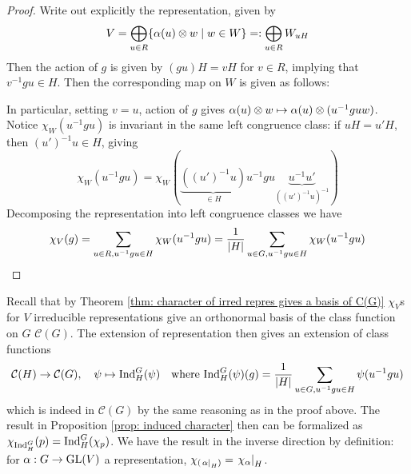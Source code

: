 \documentclass{article}
\begin{document}
\begin{proof}
    Write out explicitly the representation, given by
    \[
        V = \bigoplus_{u \in R} \{ \alpha(u) \otimes w \mid w \in W \} =: \bigoplus_{u \in R} W_{uH}
    \]
    Then the action of $g$ is given by $(gu) H = v H$ for $v \in R$, implying that $v^{-1} g u \in H$. Then the corresponding map on $W$ is given as follows:

    \begin{minipage}{\linewidth}
        \centering
    \end{minipage}
    In particular, setting $v = u$, action of $g$ gives $\alpha(u) \otimes w \mapsto \alpha(u) \otimes (u^{-1} gu w)$. Notice $\chi_W (u^{-1} g u)$ is invariant in the same left congruence class: if $uH = u'H$, then $(u')^{-1} u \in H$, giving 
    \[
        \chi_W (u^{-1} g u) = \chi_W (\underbrace{((u')^{-1} u)}_{\in H} u^{-1} g u \underbrace{u^{-1} u'}_{((u')^{-1} u)^{-1}} )
    \]
    Decomposing the representation into left congruence classes we have
    \[
        \chi_V (g) = \sum_{u \in R, u^{-1} g u \in H} \chi_W (u^{-1} g u) = \frac{1}{\left|H\right|} \sum_{u \in G, u^{-1} g u \in H} \chi_W (u^{-1} g u)
    \]
\end{proof}

Recall that by Theorem \ref{thm: character of irred repres gives a basis of C(G)} $\chi_V$s for $V$ irreducible representations give an orthonormal basis of the class function on $G$ $\mathcal{C}(G)$. The extension of representation then gives an extension of class functions
\[
    \mathcal{C}(H) \to \mathcal{C}(G), \quad \psi \mapsto \mathrm{Ind}_H^G (\psi) \quad \text{where } \mathrm{Ind}_H^G (\psi) (g) = \frac{1}{\left|H\right|} \sum_{u \in G, u^{-1} g u \in H} \psi(u^{-1} g u)
\]
which is indeed in $\mathcal{C}(G)$ by the same reasoning as in the proof above. The result in Proposition \ref{prop: induced character} then can be formalized as $\chi_{\mathrm{Ind}_H^G}(p) = \mathrm{Ind}_H^G (\chi_p)$. We have the result in the inverse direction by definition: for $\alpha : G \to \mathrm{GL}(V)$ a representation, $\chi_{(\left.\alpha\right|_{H})} = \left.\chi_{\alpha}\right|_{H}$.
\end{document}
